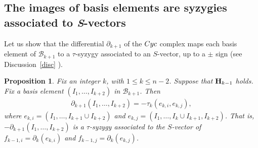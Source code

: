 \documentclass[10pt]{amsart}
\newcommand{\mcb}{\mbox{$\mathcal{B}$}}
\newcommand{\mbfh}{\mbox{${\bf H}$}}
\newcommand{\dif}{\mbox{$\partial$}}
\newcommand{\cyc}{\mbox{${\rm Cyc}$}}
\newtheorem{proposition}[cdrthm]{Proposition}
\theoremstyle{definition}
\theoremstyle{remark}
\begin{document}
\subsection{The images  of basis elements 
are syzygies associated to {\em S}-vectors} %

 Let us show that the differential $\dif_{k+1}$ of the $\cyc$
complex maps each basis element of $\mcb_{k+1}$ to a $\tau$-syzygy
associated to an $S$-vector, up to a $\pm$ sign (see
Discussion~\ref{disc} ).

\begin{proposition}\label{tau}
Fix an integer $k$, with $1\leq k\leq n-2$. Suppose that $\mbfh_{k-1}$
holds. Fix a basis element $(I_1,\ldots ,I_{k+2})$ in $\mcb_{k+1}$.
Then
\begin{eqnarray*}
\dif_{k+1}(I_1,\ldots,I_{k+2})=-\tau_{k}(e_{k,i},e_{k,j}),
\end{eqnarray*}
where $e_{k,i}=(I_1,\ldots ,I_{k+1}\cup I_{k+2})$ and
$e_{k,j}=(I_1,\ldots,I_{k}\cup I_{k+1},I_{k+2})$. That is,
$-\dif_{k+1}(I_1,\ldots,I_{k+2})$ is a $\tau$-syzygy associated to the
$S$-vector of $f_{k-1,i}=\dif_{k}(e_{k,i})$ and
$f_{k-1,j}=\dif_{k}(e_{k,j})$.
\end{proposition}
\end{document}
